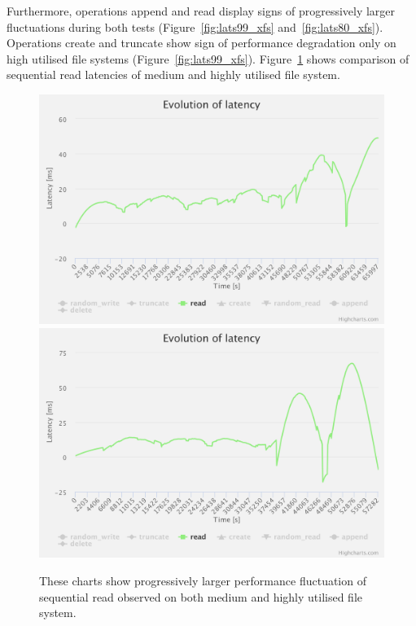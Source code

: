 \documentclass[
  color, %
  table, %
  lof,   %
  lot,   %
]{fithesis3}
\begin{document}
Furthermore, operations append and read display signs of progressively larger fluctuations during both tests (Figure~\ref{fig:lats99_xfs} and~\ref{fig:lats80_xfs}). Operations create and truncate show sign of performance degradation only on high utilised file systems (Figure~\ref{fig:lats99_xfs}). Figure~\ref{fig:read_lh} shows comparison of sequential read latencies of medium and highly utilised file system.

\begin{figure}[!htb]
    \centering
   \begin{minipage}{\textwidth}
        \centering
        \includegraphics[width=\textwidth]{../charts/HDD_xfs/read_high}
        \includegraphics[width=\textwidth]{../charts/HDD_xfs/read_low}
        \caption[Evolution of sequential read of XFS during testing of high and medium utilisation of HDD]{These charts show progressively larger performance fluctuation of sequential read observed on both medium and highly utilised file system.}
\label{fig:read_lh}
    \end{minipage}
\end{figure}
\end{document}
